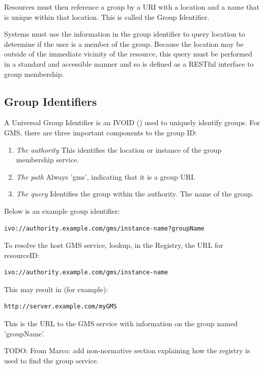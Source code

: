\documentclass[11pt,a4paper]{ivoa}
\begin{document}
Resources must then reference a group by a URI with a location and a name that is unique within that location.  This is called the Group Identifier.

Systems must use the information in the group identifier to query location to determine if the user is a member of the group.  Because the location may be outside of the immediate vicinity of the resource, this query must be performed in a standard and accessible manner and so is defined as a RESTful interface to group membership.

\subsection{Group Identifiers}

A Universal Group Identifier is an IVOID (\citep{std:VOID2}) used to uniquely identify groups.  For GMS, there are three important components to the group ID:

\begin{enumerate}
\item \emph{The authority} This identifies the location or instance of the group membership service.
\item \emph{The path} Always 'gms', indicating that it is a group URI.
\item \emph{The query} Identifies the group within the authority.  The name of the group.
\end{enumerate}

Below is an example group identifier:

\begin{verbatim}
ivo://authority.example.com/gms/instance-name?groupName
\end{verbatim}

To resolve the host GMS service, lookup, in the Registry, the URL for resourceID:

\begin{verbatim}
ivo://authority.example.com/gms/instance-name
\end{verbatim}

This may result in (for example):

\begin{verbatim}
http://server.example.com/myGMS
\end{verbatim}

This is the URL to the GMS service with information on the group named 'groupName'.

TODO: From Marco: add non-normative section explaining how the registry is used to find the group service.
\end{document}

